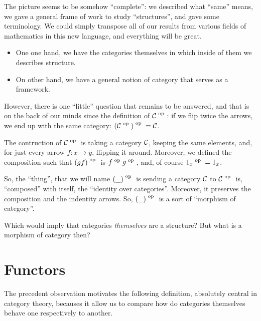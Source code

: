 \documentclass[a4paper]{article}
\theoremstyle { remark }
\theoremstyle { definition }
\theoremstyle { plain }
\begin{document}
The picture seems to be somehow \enquote{complete}: we described what \enquote{same} means, we gave a general frame of work to study \enquote{structures}, and gave some terminology.
We could simply transpose all of our results from various fields of mathematics in this new language, and everything will be great.

\begin{itemize}
\item One one hand, we have the categories themselves in which inside of them we describes structure.
\item On other hand, we have a general notion of category that serves as a framework.
\end{itemize}

However, there is one \enquote{little} question that remains to be answered, and that is on the back of our minds since the definition of \(  {  \mathcal { C }  {} } ^ \text { op }  \): if we flip twice the arrows, we end up with the same category: \(  {( {  \mathcal { C }  {} } ^ \text { op } )} ^ \text { op }  =  \mathcal { C }  \).

The contruction of \(  {  \mathcal { C }  {} } ^ \text { op }  \) is taking a category \(  \mathcal { C }  \), keeping the same elements, and, for just every arrow \( f \colon x \to y \), flipping it around.
Moreover, we defined the composition such that \(  {(gf)} ^ \text { op }  \) is \(  {f} ^ \text { op }   {g} ^ \text { op }  \), and, of course $\op{\one[x]} = \one[x]$.

So, the \enquote{thing}, that we will name \(  {(\_)} ^ \text { op }  \) is sending a category \(  \mathcal { C }  \) to \(  {  \mathcal { C }  {} } ^ \text { op }  \) is, \enquote{composed} with itself, the \enquote{identity over categories}.
Moreover, it preserves the composition and the indentity arrows.
So, \(  {(\_)} ^ \text { op }  \) is a sort of \enquote{morphism of category}.

Which would imply that categories \emph{themselves} are a structure?
But what is a morphism of category then?

\section{Functors}

The precedent observation motivates the following definition, absolutely central in category theory, becauses it allow us to compare how do categories themselves behave one respectively to another.
\end{document}
